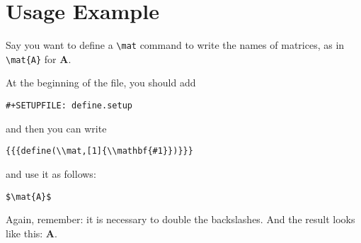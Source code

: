 \documentclass[11pt]{article}
\newcommand{\mat}[1]{\mathbf{#1}}
\begin{document}
\section*{Usage Example}
\label{sec-2}

Say you want to define a \verb~\mat~ command to write the names of
matrices, as in \verb~\mat{A}~ for $\mat{A}$.

At the beginning of the file, you should add
\begin{verbatim}
#+SETUPFILE: define.setup
\end{verbatim}
and then you can write
\begin{verbatim}
{{{define(\\mat,[1]{\\mathbf{#1}})}}}
\end{verbatim}
and use it as follows:
\begin{verbatim}
$\mat{A}$
\end{verbatim}

Again, remember: it is necessary to double the backslashes.  And the
result looks like this: $\mat{A}$.
\end{document}
